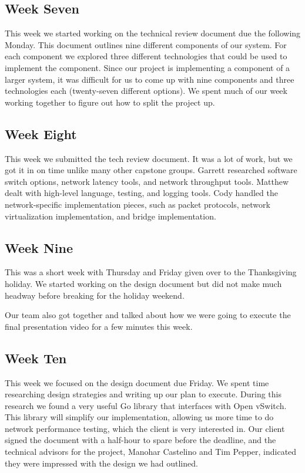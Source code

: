 \documentclass[10pt,onecolumn,journal,draftclsnofoot]{IEEEtran}
\begin{document}
\subsection{Week Seven}

This week we started working on the technical review document due the following
Monday. This document outlines nine different components of our system. For each
component we explored three different technologies that could be used to
implement the component. Since our project is implementing a component of a
larger system, it was difficult for us to come up with nine components and three
technologies each (twenty-seven different options). We spent much of our week
working together to figure out how to split the project up.

\subsection{Week Eight}

This week we submitted the tech review document. It was a lot of work, but we
got it in on time unlike many other capstone groups. Garrett researched software
switch options, network latency tools, and network throughput tools. Matthew
dealt with high-level language, testing, and logging tools. Cody handled the
network-specific implementation pieces, such as packet protocols, network
virtualization implementation, and bridge implementation.

\subsection{Week Nine}

This was a short week with Thursday and Friday given over to the Thanksgiving
holiday. We started working on the design document but did not make much headway
before breaking for the holiday weekend.

Our team also got together and talked about how we were going to execute the
final presentation video for a few minutes this week.

\subsection{Week Ten}

This week we focused on the design document due Friday. We spent time
researching design strategies and writing up our plan to execute. During this
research we found a very useful Go library that interfaces with Open vSwitch.
This library will simplify our implementation, allowing us more time to do
network performance testing, which the client is very interested in. Our client
signed the document with a half-hour to spare before the deadline, and the
technical advisors for the project, Manohar Castelino and Tim Pepper, indicated
they were impressed with the design we had outlined.
\end{document}
